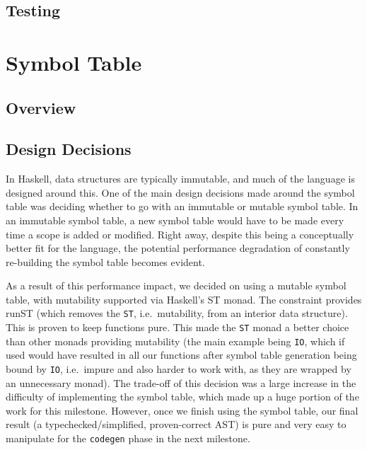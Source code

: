 \documentclass[11pt]{article}
\begin{document}
\subsection{Testing} %
\section{Symbol Table}
\subsection{Overview}
\subsection{Design Decisions}
In Haskell, data structures are typically immutable, and much of the
language is designed around this. One of the main design decisions
made around the symbol table was deciding whether to go with an
immutable or mutable symbol table. In an immutable symbol table, a new
symbol table would have to be made every time a scope is added or
modified. Right away, despite this being a conceptually better fit for
the language, the potential performance degradation of constantly
re-building the symbol table becomes evident.

As a result of this performance impact, we decided on using a mutable
symbol table, with mutability supported via Haskell's
ST\cite{hackage:st}
monad. The constraint provides
runST\cite{hackage:runst}
(which removes the \texttt{ST}, i.e.\ mutability, from an interior
data structure). This is proven\cite{monadicstate} to keep functions pure. This made the \texttt{ST} monad a better choice than other
monads providing mutability (the main example being \texttt{IO}, which
if used would have resulted in all our functions after symbol table
generation being bound by \texttt{IO}, i.e.\ impure and also harder to
work with, as they are wrapped by an unnecessary monad). The trade-off
of this decision was a large increase in the difficulty of
implementing the symbol table, which made up a huge portion of the
work for this milestone.  However, once we finish using the symbol
table, our final result (a typechecked/simplified, proven-correct AST)
is pure and very easy to manipulate for the \texttt{codegen} phase in
the next milestone.
\end{document}
